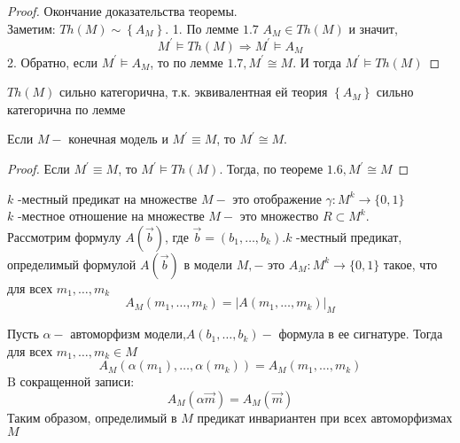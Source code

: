 \begin{proof}
Окончание доказательства теоремы.\\
Заметим: $T h(M) \sim\left\{A_{M}\right\} $.
1. По лемме $1.7$ $A_{M} \in T h(M)$ и значит,
$$
M^{\prime} \vDash T h(M) \Rightarrow M^{\prime} \vDash A_{M}
$$
2. Обратно, если $M^{\prime} \vDash A_{M}$, то по лемме $1.7, M^{\prime} \cong M $. И тогда $M^{\prime} \vDash T h(M)$
\end{proof}

$T h(M)$ сильно категорична, т.к. эквивалентная ей теория $\left\{A_{M}\right\}$ сильно категорична по лемме
\begin{corol}
Если $M-$ конечная модель и $M^{\prime} \equiv M$, то $M^{\prime} \cong M $.
\end{corol}
\begin{proof}
Если $M^{\prime} \equiv M$, то $M^{\prime} \vDash T h(M) $. Тогда, по теореме $1.6, M^{\prime} \cong M$
\end{proof}

$k$ -местный предикат на множестве $M-$ это отображение $\gamma: M^{k} \longrightarrow\{0,1\}$\\
$k$ -местное отношение на множестве $M-$ это множество $R \subset M^{k} $.\\
Рассмотрим формулу $A(\vec{b})$, где $\vec{b}=\left(b_{1}, \ldots, b_{k}\right) . k$ -местный предикат, определимый формулой $A(\vec{b})$ в модели $M,-$ это $A_{M}: M^{k} \longrightarrow\{0,1\}$ такое, что для всех $m_{1}, \ldots, m_{k}$
$$
A_{M}\left(m_{1}, \ldots, m_{k}\right)=\left|A\left(m_{1}, \ldots, m_{k}\right)\right|_{M}
$$
\begin{theo}
Пусть $\alpha-$ автоморфизм модели,$A\left(b_{1}, \ldots, b_{k}\right)-$ формула в ее сигнатуре. Тогда для всех $m_{1}, \ldots, m_{k} \in M$
$$
A_{M}\left(\alpha\left(m_{1}\right), \ldots, \alpha\left(m_{k}\right)\right)=A_{M}\left(m_{1}, \ldots, m_{k}\right)
$$
$\mathrm{B}$ сокращенной записи:
$$
A_{M}(\alpha \vec{m})=A_{M}(\vec{m})
$$
Таким образом, определимый в $M$ предикат инвариантен при всех автоморфизмах $M$
\end{theo}